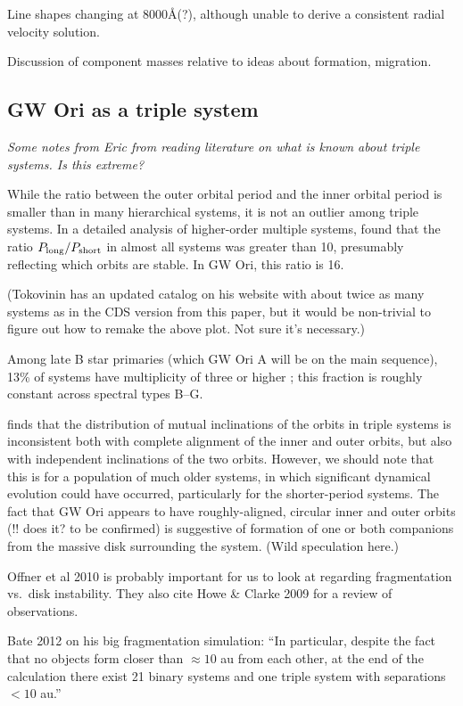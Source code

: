 \documentclass{aastex6}
\begin{document}
Line shapes changing at 8000\AA (?), although unable to derive a consistent radial velocity solution.

Discussion of component masses relative to ideas about formation, migration.

\subsection{GW Ori as a triple system}

{\it Some notes from Eric from reading literature on what is known about triple systems.  Is this extreme?}

While the ratio between the outer orbital period and the inner orbital period is smaller than in many hierarchical systems, it is not an outlier among triple systems.  In a detailed analysis of higher-order multiple systems, \citet{tokovinin97} found that the ratio $P_{\rm long} / P_{\rm short}$ in almost all systems was greater than 10, presumably reflecting which orbits are stable.  In GW Ori, this ratio is 16.

(Tokovinin has an updated catalog on his website with about twice as many systems as in the CDS version from this paper, but it would be non-trivial to figure out how to remake the above plot.  Not sure it's necessary.)

Among late B star primaries (which GW Ori A will be on the main sequence), 13\% of systems have multiplicity of three or higher \citep{eggleton08}; this fraction is roughly constant across spectral types B--G.

\citet{tokovinin97} finds that the distribution of mutual inclinations of the orbits in triple systems is inconsistent both with complete alignment of the inner and outer orbits, but also with independent inclinations of the two orbits.  However, we should note that this is for a population of much older systems, in which significant dynamical evolution could have occurred, particularly for the shorter-period systems.  The fact that GW Ori appears to have roughly-aligned, circular inner and outer orbits (!! does it?  to be confirmed) is suggestive of formation of one or both companions from the massive disk surrounding the system.  (Wild speculation here.)

Offner et al 2010 is probably important for us to look at regarding fragmentation vs.\ disk instability.  They also cite Howe \& Clarke 2009 for a review of observations.

Bate 2012 on his big fragmentation simulation: ``In particular, despite the fact that no objects form closer than $\approx 10$ au from each other, at the end of the calculation there exist 21 binary systems and one triple system with separations $<10$ au.''
\end{document}
